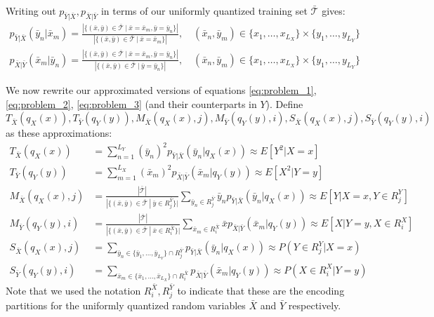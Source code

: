 \documentclass[10pt,twoside,titlepage]{article}
\begin{document}
Writing out $p_{\bar Y|\bar X}, p_{\bar X|\bar Y}$ in terms of our uniformly quantized training set $\mathcal{\bar T}$ gives:
\begin{align}
    p_{\bar Y|\bar X}(\bar y_n | \bar x_m)=\frac{
            \left|\{(\bar x,\bar y)\in \mathcal{\bar T}\ |\ \bar x = \bar x_m, \bar y = \bar y_n\}\right|
        }{
            \left|\{(\bar x,\bar y)\in \mathcal{\bar T}\ |\ \bar x = \bar x_m\}\right|
        },\quad (\bar x_n, \bar y_m)\in \{x_1,\ldots,x_{L_X}\}\times\{y_1,\ldots,y_{L_Y}\}\\
    p_{\bar X|\bar Y}(\bar x_m | \bar y_n)=\frac{
            \left|\{(\bar x,\bar y)\in \mathcal{\bar T}\ |\ \bar x = \bar x_m, \bar y = \bar y_n\}\right|
        }{
            \left|\{(\bar x,\bar y)\in \mathcal{\bar T}\ |\ \bar y = \bar y_n\}\right|
        },\quad (\bar x_n, \bar y_m)\in \{x_1,\ldots,x_{L_X}\}\times\{y_1,\ldots,y_{L_Y}\}
\end{align}

We now rewrite our approximated versions of equations \eqref{eq:problem_1}, \eqref{eq:problem_2}, \eqref{eq:problem_3} (and their counterparts in $Y$). Define $T_{\bar X}(q_X(x)),T_{\bar Y}(q_Y(y)),M_{\bar X}(q_X(x),j),M_{\bar Y}(q_Y(y),i),S_{\bar X}(q_X(x),j),S_{\bar Y}(q_Y(y),i)$ as these approximations:
\begin{align*}
    T_{\bar X}(q_X(x)) &= \sum_{n=1}^{L_Y}(\bar y_n)^2p_{\bar Y|\bar X}(\bar y_n|q_X(x)) \approx E[Y^2 | X = x]\\
    T_{\bar Y}(q_Y(y)) &= \sum_{m=1}^{L_X}(\bar x_m)^2p_{\bar X|\bar Y}(\bar x_m|q_Y(y)) \approx E[X^2 | Y = y]\\
    M_{\bar X}(q_X(x),j) &= 
        \frac{
            |\mathcal{\bar T}|
        }{
            |\{(\bar x, \bar y)\in \mathcal{\bar T}\ |\ \bar y\in R_j^{\bar Y}\}|
        } \sum_{\bar y_n\in R_j^{\bar Y}}\bar y_np_{\bar Y|\bar X}(\bar y_n|q_X(x))
        \approx E[Y|X=x,Y\in R_j^{Y}]\\
    M_{\bar Y}(q_Y(y),i) &= 
        \frac{
            |\mathcal{\bar T}|
        }{
            |\{(\bar x,\bar y)\in \mathcal{\bar T}\ |\ \bar x\in R_i^{\bar X}\}|
        } \sum_{\bar x_m\in R_i^{\bar X}}\bar xp_{\bar X|\bar Y}(\bar x_m|q_Y(y))
        \approx E[X|Y=y,X\in R_i^{X}]\\
    S_{\bar X}(q_X(x),j) &= 
        \sum_{\bar y_n\in \{\bar y_1,\ldots,\bar y_{L_Y}\}\cap R_j^{\bar Y}}p_{\bar Y|\bar X}(\bar y_n|q_X(x)) 
        \approx P(Y\in R_j^{Y}|X=x)\\
    S_{\bar Y}(q_Y(y),i) &= 
        \sum_{\bar x_m\in \{\bar x_1,\ldots,\bar x_{L_X}\}\cap R_i^{\bar X}}p_{\bar X|\bar Y}(\bar x_m|q_Y(y)) 
        \approx P(X\in R_i^{X}|Y=y)
\end{align*}
Note that we used the notation $R_i^{\bar X}, R_j^{\bar Y}$ to indicate that these are the encoding partitions for the uniformly quantized random variables $\bar X$ and $\bar Y$ respectively.
\end{document}
